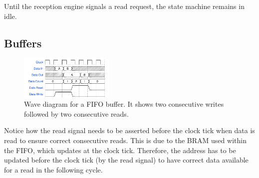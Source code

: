Until the reception engine signals a read request, the state machine remains in idle.


\subsection{Buffers}


\begin{figure}[!ht]
    \centering
    \includegraphics[width=0.40\textwidth]{figures/wavediagram-fifo}
    \caption{Wave diagram for a FIFO buffer. It shows two consecutive writes followed by two consecutive reads.}
    \label{fig:wavediagram-fifo}
\end{figure}

Notice how the read signal needs to be asserted before the clock tick when data is read to ensure correct consecutive reads.
This is due to the BRAM used within the FIFO, which updates at the clock tick.
Therefore, the address has to be updated before the clock tick (by the read signal) to have correct data available for a read in the following cycle.

